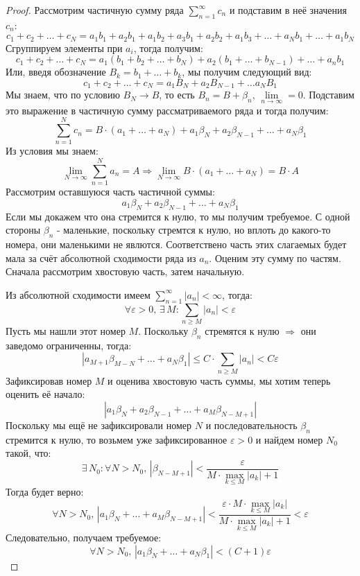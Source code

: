 \documentclass[12pt]{article}
\newcommand{\VE}{\varepsilon}
\theoremstyle{definition}
\DeclareMathOperator*{\dsum}{\displaystyle\sum}
\begin{document}
\begin{proof}
	Рассмотрим частичную сумму ряда $\dsum\limits_{n = 1}^{\infty} c_n$ и подставим в неё значения $c_n$:
	$$
		c_1 + c_2 + \dotsc + c_N = a_1 b_1 + a_2 b_1 + a_1 b_2 + a_3 b_1 + a_2 b_2 + a_1 b_3 + \dotsc + a_N b_1 + \dotsc + a_1 b_N
	$$
	Сгруппируем элементы при $a_i$, тогда получим:
	$$
		c_1 + c_2 + \dotsc + c_N = a_1 (b_1 + b_2 + \dotsc + b_N) + a_2(b_1 + \dotsc + b_{N-1}) + \dotsc + a_n b_1
	$$
	Или, введя обозначение $B_k = b_1 + \dotsc + b_k$, мы получим следующий вид:
	$$
		c_1 + c_2 + \dotsc + c_N = a_1 B_N + a_2 B_{N-1} + \dotsc a_N B_1
	$$
	Мы знаем, что по условию $B_N  \to B$, то есть $B_n = B + \beta_n, \, \lim\limits_{n \to \infty } =0$. Подставим это выражение в частичную сумму рассматриваемого ряда и тогда получим:
	$$
		\sum\limits_{n = 1}^{N} c_n = B{\cdot}(a_1 + \dotsc + a_N) + a_1 \beta_N + a_2 \beta_{N-1} + \dotsc + a_N \beta_1
	$$
	Из условия мы знаем:
	$$
		\lim\limits_{N \to \infty} \dsum\limits_{n = 1}^{N}a_n = A \Rightarrow \lim\limits_{N \to \infty} B{\cdot}(a_1 + \dotsc + a_N) = B{\cdot}A
	$$ 
	Рассмотрим оставшуюся часть частичной суммы: 
	$$
		a_1 \beta_N + a_2 \beta_{N-1} + \dotsc + a_N \beta_1
	$$
	Если мы докажем что она стремится к нулю, то мы получим требуемое. С одной стороны $\beta_n$ - маленькие, поскольку стремтся к нулю, но вплоть до какого-то номера, они маленькими не явлются. Соответствено часть этих слагаемых будет мала за счёт абсолютной сходимости ряда из $a_n$. Оценим эту сумму по частям. Сначала рассмотрим хвостовую часть, затем начальную.
	
	Из абсолютной сходимости имеем $\dsum\limits_{n = 1}^{\infty}|a_n| < \infty$, тогда:
	$$
		\forall \VE > 0, \, \exists \, M \colon \dsum\limits_{n \geq M}|a_n| < \VE
	$$
	Пусть мы нашли этот номер $M$. Поскольку $\beta_n$ стремятся к нулю $\Rightarrow$ они заведомо ограниченны, тогда:
	$$
		\left|a_{M+1} \beta_{M-N} + \dotsc + a_N \beta_1\right| \leq C{\cdot} \sum\limits_{n \geq M}|a_n| < C\VE
	$$
	Зафиксировав номер $M$ и оценива хвостовую часть суммы, мы хотим теперь оценить её начало:
	$$
		\left|a_1 \beta_N + a_2 \beta_{N-1} + \dotsc + a_M \beta_{N - M + 1}\right|
	$$
	Поскольку мы ещё не зафиксировали номер $N$ и последовательность $\beta_n$ стремится к нулю, то возьмем уже зафиксированное $\VE > 0$ и найдем номер $N_0$ такой, что:
	$$
		\exists \, N_0 \colon \forall N > N_0, \, \left|\beta_{N - M + 1}\right| < \dfrac{\VE}{M{\cdot}\max\limits_{k \leq M}\left|a_k\right| + 1}
	$$
	Тогда будет верно:
	$$
		\forall N > N_0, \, |a_1 \beta_N  + \dotsc + a_M \beta_{N - M + 1}| < \dfrac{\VE {\cdot} M{\cdot}\max\limits_{k \leq M}\left|a_k\right|}{M{\cdot}\max\limits_{k \leq M}\left|a_k\right| + 1} < \VE
	$$
	Следовательно, получаем требуемое:
	$$
		\forall N > N_0,\, \left|a_1 \beta_N + \dotsc + a_N \beta_1 \right| < (C + 1)\VE
	$$
\end{proof}
\end{document}
